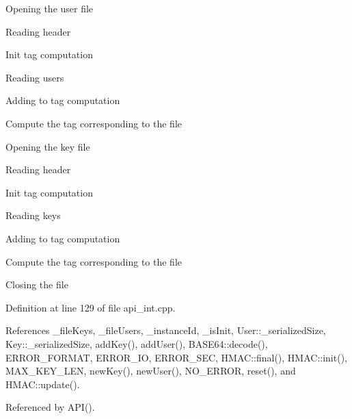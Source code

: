  
\begin{DoxyEnumerate}
\item Opening the user file


\item Reading header


\item Init tag computation 


\item Reading users


\item Adding to tag computation 


\item Compute the tag corresponding to the file 


\item Opening the key file


\item Reading header


\item Init tag computation 


\item Reading keys


\item Adding to tag computation 


\item Compute the tag corresponding to the file 


\item Closing the file


\end{DoxyEnumerate}

Definition at line 129 of file api\+\_\+int.\+cpp.



References \+\_\+file\+Keys, \+\_\+file\+Users, \+\_\+instance\+Id, \+\_\+is\+Init, User\+::\+\_\+serialized\+Size, Key\+::\+\_\+serialized\+Size, add\+Key(), add\+User(), B\+A\+S\+E64\+::decode(), E\+R\+R\+O\+R\+\_\+\+F\+O\+R\+M\+A\+T, E\+R\+R\+O\+R\+\_\+\+I\+O, E\+R\+R\+O\+R\+\_\+\+S\+E\+C, H\+M\+A\+C\+::final(), H\+M\+A\+C\+::init(), M\+A\+X\+\_\+\+K\+E\+Y\+\_\+\+L\+E\+N, new\+Key(), new\+User(), N\+O\+\_\+\+E\+R\+R\+O\+R, reset(), and H\+M\+A\+C\+::update().



Referenced by A\+P\+I().

\hypertarget{classAPI_a94ef4273680b86b5340442d965b48fab}{}
